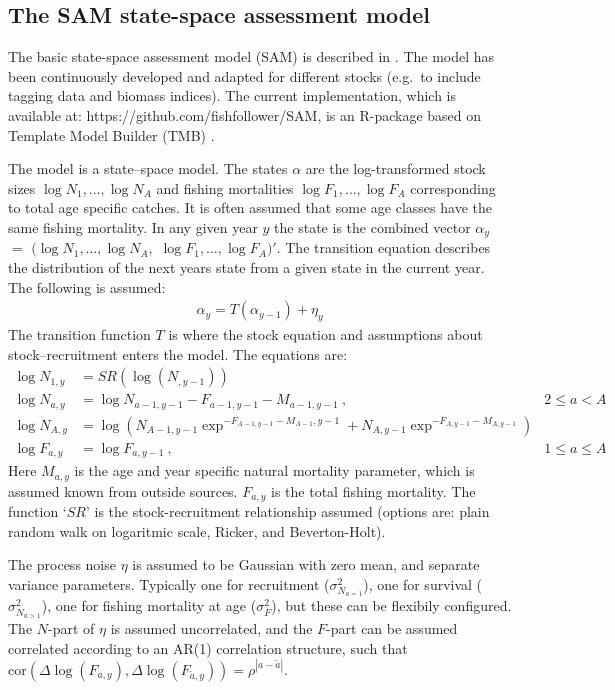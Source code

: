 \documentclass[12pt,letterpaper, leqno]{article}
\begin{document}
\subsection*{The SAM state-space assessment model}

The basic state-space assessment model (SAM) is described in \citet{nielsen2014estimation}. The model has been continuously developed and adapted for different stocks (e.g.~to include tagging data and biomass indices). The current implementation, which is available at: https://github.com/fishfollower/SAM, is an R-package based on Template Model Builder (TMB) \citep{kristensenetal16}.

The model is a state--space model. The states $\alpha$ are the log-transformed stock sizes $\log{N_1},\ldots,\log{N_A}$ and fishing mortalities $\log{F_1},\ldots,\log{F_{A}}$ corresponding to total age specific catches. It is often assumed that some age classes have the same fishing mortality. In any given year $y$ the state is the combined vector $\alpha_y$ $=$ $(\log{N_1},\ldots,\log{N_A},$ $ \log{F_1},\ldots,\log{F_{A}})'$. The transition equation describes the distribution of the next years state from a given state in the current year. The following is assumed: 
 \begin{align*}
 \alpha_{y}=T(\alpha_{y-1})+\eta_y
 \end{align*}  
 The transition function $T$ is where the stock equation and assumptions about stock--recruitment enters the model. The equations are:   
 \begin{align*}
 \log N_{1,y}&=SR(\log(N_{,y-1}))&\\
 \log N_{a,y}&=\log N_{a-1,y-1} - F_{a-1,y-1} - M_{a-1,y-1}\ , \quad &2\leq a < A \\
 \log N_{A,y}&=\log( N_{A-1,y-1}\exp^{- F_{A-1,y-1} - M_{A-1},y-1} + N_{A,y-1}\exp^{- F_{A,y-1} - M_{A,y-1}})&\\
 \log F_{a,y}&=\log F_{a,y-1}\ , \quad &1\leq a \leq A 
 \end{align*}  
Here $M_{a,y}$ is the age and year specific natural mortality parameter, which is assumed known from outside sources. $F_{a,y}$ is the total fishing mortality. The function `$SR$' is the stock-recruitment relationship assumed (options are: plain random walk on logaritmic scale, Ricker, and Beverton-Holt). 

The process noise $\eta$ is assumed to be Gaussian with zero mean, and separate variance parameters. Typically one for recruitment ($\sigma^2_{N_{a=1}}$), one for survival ($\sigma^2_{N_{a>1}}$), one for fishing mortality at age ($\sigma^2_{F}$), but these can be flexibily configured. The $N$-part of $\eta$ is assumed uncorrelated, and the $F$-part can be assumed correlated according to an AR(1) correlation structure, such that $\mbox{cor}(\Delta\log(F_{a,y}),\Delta\log(F_{\tilde{a},y}))=\rho^{|a-\tilde{a}|}$. 
\end{document}
